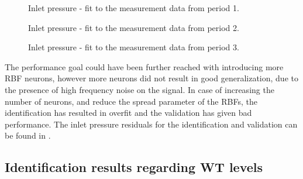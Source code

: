   \begin{figure}[H]
  \centering
   
  \vspace{-2.5mm}
  \caption{Inlet pressure - fit to the measurement data from period 1.}
  \label{fig:fit_pk2_p1}
  \end{figure}
 \vspace{-3mm}

  \begin{figure}[H]
  \centering
   
  \vspace{-2.5mm}
  \caption{Inlet pressure - fit to the measurement data from period 2.}
  \label{fig:fit_pk2_p2}
  \end{figure}
 \vspace{-3mm}

  \begin{figure}[H]
  \centering
   
  \vspace{-2.5mm}
  \caption{Inlet pressure - fit to the measurement data from period 3.}
  \label{fig:fit_pk2_p3}
  \end{figure}
 \vspace{-3mm}

 The performance goal could have been further reached with introducing more RBF neurons, however more neurons did not result in good generalization, due to the presence of high frequency noise on the signal. In case of increasing the number of neurons, and reduce the spread parameter of the RBFs, the identification has resulted in overfit and the validation has given bad performance. The inlet pressure residuals for the identification and validation can be found in . 

\newpage
  \subsection{Identification results regarding WT levels}
 \label{state_results}

